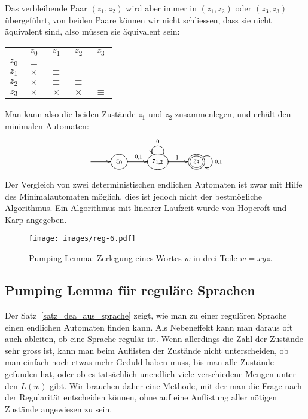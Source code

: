Das verbleibende Paar $(z_1,z_2)$ wird aber immer in $(z_1,z_2)$ 
oder $(z_3,z_3)$ übergeführt, von beiden Paare können wir nicht
schliessen, dass sie nicht äquivalent sind, also müssen sie äquivalent
sein:
\begin{center}
\begin{tabular}{ccccc}
     &$z_0$   &$z_1$   &$z_2$   &$z_3$   \\
$z_0$&$\equiv$&        &        &        \\
$z_1$&$\times$&$\equiv$&        &        \\
$z_2$&$\times$&$\equiv$&$\equiv$&        \\
$z_3$&$\times$&$\times$&$\times$&$\equiv$
\end{tabular}
\end{center}
Man kann also die beiden Zustände $z_1$ und $z_2$ zusammenlegen,
und erhält den minimalen Automaten:
\[
\entrymodifiers={++[o][F]}
\xymatrix{
*+\txt{} \ar[r]
	&{z_0}\ar[r]^{0,1} 
		&{z_{1,2}}\ar@(ur,ul)_{0}\ar[r]^1
			&*++[o][F=]{z_3}\ar@(ur,dr)^{0,1}
}
\]

Der Vergleich von zwei deterministischen endlichen Automaten ist zwar
mit Hilfe des Minimalautomaten möglich, dies ist jedoch nicht der
bestmögliche Algorithmus.
Ein Algorithmus mit linearer Laufzeit wurde von Hopcroft und Karp
angegeben.
\begin{figure}
\begin{center}
\texttt{[image: images/reg-6.pdf]}
\end{center}
\caption{Pumping Lemma: Zerlegung eines Wortes $w$ in drei Teile
$w=xyz$.\label{regular:pumpinglemma-graph}}
\end{figure}

\subsection{Pumping Lemma für reguläre Sprachen\label{regulaer:pumpinglemma}}
%
Der Satz~\ref{satz_dea_aus_sprache} zeigt, wie man zu einer regulären Sprache
einen endlichen Automaten finden kann.
Als Nebeneffekt kann man daraus oft auch ableiten, ob eine Sprache regulär
ist.
Wenn allerdings die Zahl der Zustände sehr gross ist, kann man beim
Auflisten der Zustände nicht unterscheiden, ob man einfach noch etwas
mehr Geduld haben muss, bis man alle Zustände gefunden hat, oder ob
es tatsächlich unendlich viele verschiedene Mengen unter den $L(w)$
gibt.
Wir brauchen daher eine Methode, mit der man die Frage nach der
Regularität entscheiden können, ohne auf eine Auflistung aller
nötigen Zustände angewiesen zu sein.

